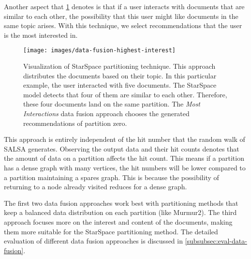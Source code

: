 Another aspect that \ref{fig:data-fusion-highest-ineterest} denotes is that if a user interacts with documents that are similar to each other, the possibility that this user might like documents in the same topic arises. With this technique, we select recommendations that the user is the most interested in. 


\begin{figure}[!htb]
    \centering
    \texttt{[image: images/data-fusion-highest-interest]}
    \caption{Visualization of StarSpace partitioning technique. This approach distributes the documents based on their topic. In this particular example, the user interacted with five documents. The StarSpace model detects that four of them are similar to each other. Therefore, these four documents land on the same partition. The \emph{Most Interactions} data fusion approach chooses the generated recommendations of partition zero.}
    \label{fig:data-fusion-highest-ineterest}
\end{figure}


This approach is entirely independent of the hit number that the random walk of SALSA generates. Observing the output data and their hit counts denotes that the amount of data on a partition affects the hit count. This means if a partition has a dense graph with many vertices, the hit numbers will be lower compared to a partition maintaining a spares graph. This is because the possibility of returning to a node already visited reduces for a dense graph.


The first two data fusion approaches work best with partitioning methods that keep a balanced data distribution on each partition (like Murmur2). The third approach focuses more on the interest and content of the documents, making them more suitable for the StarSpace partitioning method. The detailed evaluation of different data fusion approaches is discussed in \ref{subsubsec:eval-data-fusion}.

